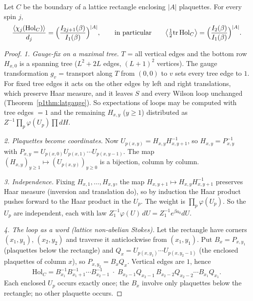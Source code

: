 \begin{theorem}\label{p2thm:area}
 Let $C$ be the boundary of a lattice rectangle enclosing $|A|$ plaquettes. For every spin $j$,
\[
\frac{\langle\chi_j(\mathrm{Hol}_C)\rangle}{d_j}=\Bigl(\frac{I_{2j+1}(\beta)}{I_1(\beta)}\Bigr)^{|A|},
\qquad\text{in particular}\qquad
\bigl\langle\tfrac12\mathrm{tr}\,\mathrm{Hol}_C\bigr\rangle=\Bigl(\frac{I_2(\beta)}{I_1(\beta)}\Bigr)^{|A|}.
\]
\end{theorem}
\begin{proof}
\emph{1. Gauge-fix on a maximal tree.} $T$ = all vertical edges and the bottom row $H_{x,0}$ is a spanning tree
($L^2+2L$ edges, $(L+1)^2$ vertices). The gauge transformation $g_v$ = transport along $T$ from $(0,0)$ to $v$ sets every
tree edge to $1$. For fixed tree edges it acts on the other edges by left and right translations, which preserve Haar
measure, and it leaves $S$ and every Wilson loop unchanged (Theorem~\ref{p1thm:latgauge}). So expectations of loops may be
computed with tree edges $=1$ and the remaining $H_{x,y}$ ($y\ge1$) distributed as $Z^{-1}\prod_p\varphi(U_p)\prod dH$.

\emph{2. Plaquettes become coordinates.} Now $U_{p(x,y)}=H_{x,y}H_{x,y+1}^{-1}$, so
$H_{x,y}=P_{x,y}^{-1}$ with $P_{x,y}=U_{p(x,0)}U_{p(x,1)}\cdots U_{p(x,y-1)}$. The map
$(H_{x,y})_{y\ge1}\mapsto(U_{p(x,y)})_{y\ge0}$ is a bijection, column by column.

\emph{3. Independence.} Fixing $H_{x,1},\dots,H_{x,y}$, the map $H_{x,y+1}\mapsto H_{x,y}H_{x,y+1}^{-1}$ preserves Haar
measure (inversion and translation do), so by induction the Haar product pushes forward to the Haar product in the $U_p$.
The weight is $\prod_p\varphi(U_p)$. So the $U_p$ are independent, each with law $Z_1^{-1}\varphi(U)\,dU=Z_1^{-1}e^{\beta a_0}dU$.

\emph{4. The loop as a word (lattice non-abelian Stokes).} Let the rectangle have corners $(x_1,y_1)$, $(x_2,y_2)$ and
traverse it anticlockwise from $(x_1,y_1)$. Put $B_x=P_{x,y_1}$ (plaquettes below the rectangle) and
$Q_x=U_{p(x,y_1)}\cdots U_{p(x,y_2-1)}$ (the enclosed plaquettes of column $x$), so $P_{x,y_2}=B_xQ_x$. Vertical edges are
$1$, hence
\[
\mathrm{Hol}_C=B_{x_1}^{-1}B_{x_1+1}^{-1}\cdots B_{x_2-1}^{-1}\;\cdot\;B_{x_2-1}Q_{x_2-1}\,B_{x_2-2}Q_{x_2-2}\cdots B_{x_1}Q_{x_1}.
\]
Each enclosed $U_p$ occurs exactly once; the $B_x$ involve only plaquettes below the rectangle; no other plaquette occurs.


\end{proof}
